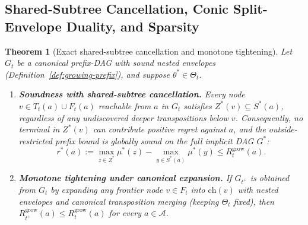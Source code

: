 \documentclass{article}
\theoremstyle{plain}
\newtheorem{theorem}{Theorem}[section]
\theoremstyle{definition}
\begin{document}
\subsection{Shared-Subtree Cancellation, Conic Split-Envelope Duality, and Sparsity}
\label{app:growing-duality}

\begin{theorem}[Exact shared-subtree cancellation and monotone tightening]
\label{thm:growing-cancellation}
Let $G_t$ be a canonical prefix-DAG with sound nested envelopes (Definition~\ref{def:growing-prefix}), and suppose $\theta^* \in \Theta_t$.
\begin{enumerate}[label=(\alph*),leftmargin=1.8em]
  \item \textbf{Soundness with shared-subtree cancellation.} Every node $v \in T_t(a) \cup F_t(a)$ reachable from $a$ in $G_t$ satisfies $Z^*(v) \subseteq S^*(a)$, regardless of any undiscovered deeper transpositions below $v$. Consequently, no terminal in $Z^*(v)$ can contribute positive regret against $a$, and the outside-restricted prefix bound is globally sound on the full implicit DAG $G^*$:
  \begin{equation}
    r^*(a) := \max_{z \in Z^*} \mu^*(z) - \max_{y \in S^*(a)} \mu^*(y) \le R_t^{\mathrm{grow}}(a).
    \label{eq:growing-sound}
  \end{equation}
  \item \textbf{Monotone tightening under canonical expansion.} If $G_{t^+}$ is obtained from $G_t$ by expanding any frontier node $v \in F_t$ into $\mathrm{ch}(v)$ with nested envelopes and canonical transposition merging (keeping $\Theta_t$ fixed), then $R_{t^+}^{\mathrm{grow}}(a) \le R_t^{\mathrm{grow}}(a)$ for every $a \in \mathcal{A}$.
\end{enumerate}
\end{theorem}
\end{document}
